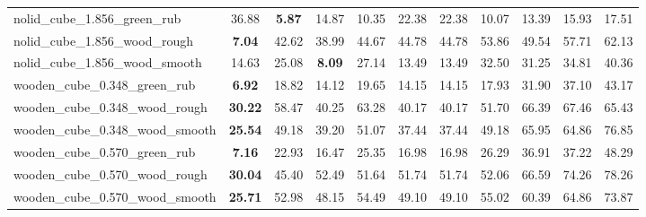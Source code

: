 \begin{table}[H]
{\begin{tabular}{l cccccccccc}
        nolid\_cube\_1.856\_green\_rub & 36.88 & \textbf{5.87} & 14.87 & 10.35 & 22.38 & 22.38 & 10.07 & 13.39 & 15.93 & 17.51 \\
        nolid\_cube\_1.856\_wood\_rough & \textbf{7.04} & 42.62 & 38.99 & 44.67 & 44.78 & 44.78 & 53.86 & 49.54 & 57.71 & 62.13 \\
        nolid\_cube\_1.856\_wood\_smooth & 14.63 & 25.08 & \textbf{8.09} & 27.14 & 13.49 & 13.49 & 32.50 & 31.25 & 34.81 & 40.36 \\
        wooden\_cube\_0.348\_green\_rub & \textbf{6.92} & 18.82 & 14.12 & 19.65 & 14.15 & 14.15 & 17.93 & 31.90 & 37.10 & 43.17 \\
        wooden\_cube\_0.348\_wood\_rough & \textbf{30.22} & 58.47 & 40.25 & 63.28 & 40.17 & 40.17 & 51.70 & 66.39 & 67.46 & 65.43 \\
        wooden\_cube\_0.348\_wood\_smooth & \textbf{25.54} & 49.18 & 39.20 & 51.07 & 37.44 & 37.44 & 49.18 & 65.95 & 64.86 & 76.85 \\
        wooden\_cube\_0.570\_green\_rub & \textbf{7.16} & 22.93 & 16.47 & 25.35 & 16.98 & 16.98 & 26.29 & 36.91 & 37.22 & 48.29 \\
        wooden\_cube\_0.570\_wood\_rough & \textbf{30.04} & 45.40 & 52.49 & 51.64 & 51.74 & 51.74 & 52.06 & 66.59 & 74.26 & 78.26 \\
        wooden\_cube\_0.570\_wood\_smooth & \textbf{25.71} & 52.98 & 48.15 & 54.49 & 49.10 & 49.10 & 55.02 & 60.39 & 64.86 & 73.87 \\
        \bottomrule
    \end{tabular}
    }
\end{table}
